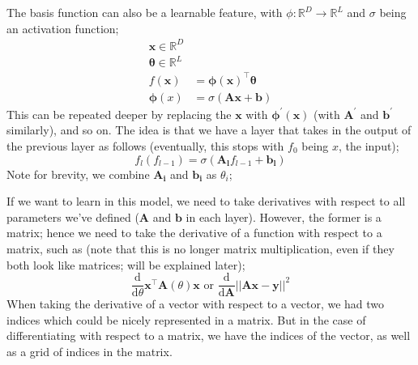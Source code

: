 \documentclass[a4paper, 12pt]{article}
\newcommand{\dif}[2]{\frac{\mathrm{d}#1}{\mathrm{d}#2}}
\newcommand{\mat}[1]{\boldsymbol{#1}}
\renewcommand{\vec}[1]{\boldsymbol{#1}}
\begin{document}
            The basis function can also be a learnable feature, with $\phi : \mathbb{R}^D \to \mathbb{R}^L$ and $\sigma$ being an activation function;
            \begin{align*}
                \vec{x} \in \mathbb{R}^D \\
                \vec{\theta} \in \mathbb{R}^L \\
                f(\vec{x}) & = \vec{\phi}(\vec{x})^\top \vec{\theta} \\
                \vec{\phi}(x) & = \sigma(\mat{A}\vec{x} + \vec{b})
            \end{align*}
            This can be repeated deeper by replacing the $\vec{x}$ with $\vec{\phi^\prime}(\vec{x})$ (with $\mat{A^\prime}$ and $\vec{b^\prime}$ similarly), and so on.
            The idea is that we have a layer that takes in the output of the previous layer as follows (eventually, this stops with $f_0$ being $x$, the input);
            $$f_l (f_{l - 1}) = \sigma(\mat{A_l} f_{l - 1} + \vec{b_l})$$
            Note for brevity, we combine $\mat{A_i}$ and $\vec{b_i}$ as $\theta_i$;
            \begin{center}
            \end{center}
            If we want to learn in this model, we need to take derivatives with respect to all parameters we've defined ($\mat{A}$ and $\vec{b}$ in each layer).
            However, the former is a matrix; hence we need to take the derivative of a function with respect to a matrix, such as (note that this is no longer matrix multiplication, even if they both look like matrices; will be explained later);
            $$\dif{}{\theta} \vec{x}^\top \mat{A}(\theta) \vec{x} \text{ or } \dif{}{\mat{A}} || \mat{A}\vec{x} - \vec{y} ||^2$$
            When taking the derivative of a vector with respect to a vector, we had two indices which could be nicely represented in a matrix.
            But in the case of differentiating with respect to a matrix, we have the indices of the vector, as well as a grid of indices in the matrix.
            \medskip
\end{document}
